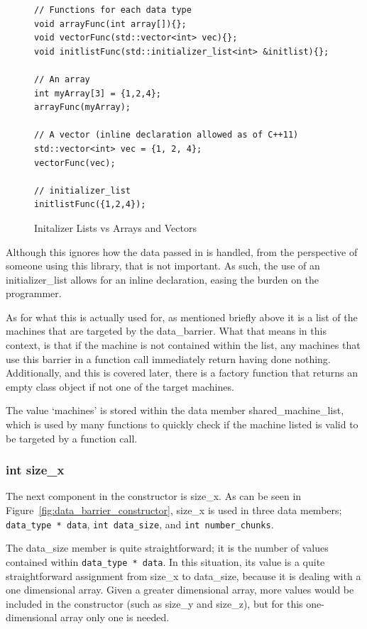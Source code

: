 \documentclass[../thesis.tex]{subfiles}
\begin{document}
     \begin{figure}[htbp]
      \centering

      \lstset{language=cpp}  
      \begin{lstlisting}[tabsize=2]
// Functions for each data type
void arrayFunc(int array[]){};
void vectorFunc(std::vector<int> vec){};
void initlistFunc(std::initializer_list<int> &initlist){};

// An array
int myArray[3] = {1,2,4};
arrayFunc(myArray);

// A vector (inline declaration allowed as of C++11)
std::vector<int> vec = {1, 2, 4};
vectorFunc(vec);

// initializer_list
initlistFunc({1,2,4});
        \end{lstlisting}

      \caption{Initalizer Lists vs Arrays and Vectors}
      \label{fig:init_list_vs_others}
    \end{figure}

    Although this ignores how the data passed in is handled, from the perspective of someone using this library, that is not important. As such, the use of an initializer\_list allows for an inline declaration, easing the burden on the programmer.

    As for what this is actually used for, as mentioned briefly above it is a list of the machines that are targeted by the data\_barrier. What that means in this context, is that if the machine is not contained within the list, any machines that use this barrier in a function call immediately return having done nothing. Additionally, and this is covered later, there is a factory function that returns an empty class object if not one of the target machines.

    The value `machines' is stored within the data member shared\_machine\_list, which is used by many functions to quickly check if the machine listed is valid to be targeted by a function call.

  \subsubsection{int size\_x} %
  \label{ssub:int_size_x}
      The next component in the constructor is size\_x. As can be seen in Figure~\ref{fig:data_barrier_constructor}, size\_x is used in three data members; \texttt{data\_type * data}, \texttt{int data\_size}, and \texttt{int number\_chunks}.

      The data\_size member is quite straightforward; it is the number of values contained within \texttt{data\_type * data}. In this situation, its value is a quite straightforward assignment from size\_x to data\_size, because it is dealing with a one dimensional array. Given a greater dimensional array, more values would be included in the constructor (such as size\_y and size\_z), but for this one-dimensional array only one is needed.
\end{document}
